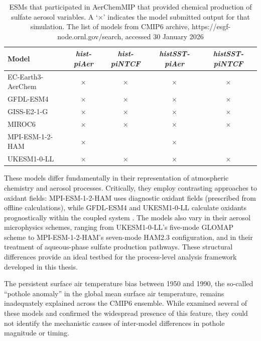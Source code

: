 \begin{table}[htbp]
\centering
\caption[ESMs that participated in AerChemMIP that provided chemical production of sulfate aerosol variables]{ESMs that participated in AerChemMIP that provided chemical production of sulfate aerosol variables. A `$\times$' indicates the model submitted output for that simulation. The list of models from CMIP6 archive, https://esgf-node.ornl.gov/search, accessed 30 January 2026}
\label{tab:ch6:aerchemmip_models}
\begin{tabular}{l c c c c}
\toprule
Model & \textit{hist-piAer} & \textit{hist-piNTCF} & \textit{histSST-piAer} & \textit{histSST-piNTCF} \\
\midrule
EC-Earth3-AerChem & $\times$ & $\times$ & $\times$ & $\times$ \\
GFDL-ESM4 & $\times$ & $\times$ & $\times$ & $\times$ \\
GISS-E2-1-G & $\times$ & $\times$ & $\times$ & $\times$ \\
MIROC6 & $\times$ & $\times$ & $\times$ & $\times$ \\
MPI-ESM-1-2-HAM & $\times$ & & $\times$ & \\
UKESM1-0-LL & $\times$ & $\times$ & $\times$ & $\times$ \\
\bottomrule
\end{tabular}
\end{table}

These models differ fundamentally in their representation of atmospheric chemistry and aerosol processes. Critically, they employ contrasting approaches to oxidant fields: MPI-ESM-1-2-HAM uses diagnostic oxidant fields (prescribed from offline calculations), while GFDL-ESM4 and UKESM1-0-LL calculate oxidants prognostically within the coupled system \citep{zhangRoleAnthropogenicAerosols2021}. The models also vary in their aerosol microphysics schemes, ranging from UKESM1-0-LL's five-mode GLOMAP scheme to MPI-ESM-1-2-HAM's seven-mode HAM2.3 configuration, and in their treatment of aqueous-phase sulfate production pathways. These structural differences provide an ideal testbed for the process-level analysis framework developed in this thesis.

The persistent surface air temperature bias between 1950 and 1990, the so-called ``pothole anomaly'' in the global mean surface air temperature, remains inadequately explained across the CMIP6 ensemble. While \citet{zhangRoleAnthropogenicAerosols2021} examined several of these models and confirmed the widespread presence of this feature, they could not identify the mechanistic causes of inter-model differences in pothole magnitude or timing. 

